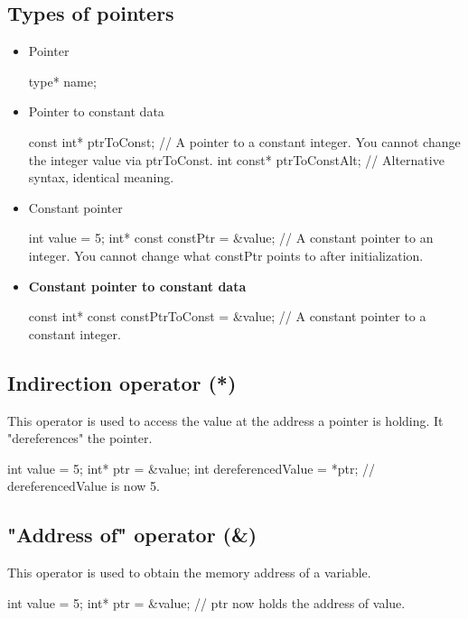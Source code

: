 \documentclass{report}
\begin{document}
    \subsection{Types of pointers}
    \begin{itemize}
        \item Pointer
            \bigbreak \noindent 
            \begin{cppcode}
            type* name;
            \end{cppcode}
        \item Pointer to constant data
            \bigbreak \noindent 
            \begin{cppcode}
            const int* ptrToConst; // A pointer to a constant integer. You cannot change the integer value via ptrToConst.
            int const* ptrToConstAlt; // Alternative syntax, identical meaning.
            \end{cppcode}
        \item Constant pointer
            \bigbreak \noindent 
            \begin{cppcode}
            int value = 5;
            int* const constPtr = &value; // A constant pointer to an integer. You cannot change what constPtr points to after initialization.
            \end{cppcode}
        \item \textbf{Constant pointer to constant data}
            \bigbreak \noindent 
            \begin{cppcode}
            const int* const constPtrToConst = &value; // A constant pointer to a constant integer.
            \end{cppcode}
    \end{itemize}

    \bigbreak \noindent 
    \subsection{Indirection operator (*)}
    \bigbreak \noindent 
    This operator is used to access the value at the address a pointer is holding. It "dereferences" the pointer.
    \bigbreak \noindent 
    \begin{cppcode}
        int value = 5;
        int* ptr = &value;
        int dereferencedValue = *ptr; // dereferencedValue is now 5.
    \end{cppcode}

    \bigbreak \noindent 
    \subsection{"Address of" operator (\&)}
    \bigbreak \noindent 
    This operator is used to obtain the memory address of a variable.
    \bigbreak \noindent 
    \begin{cppcode}
    int value = 5;
    int* ptr = &value; // ptr now holds the address of value.
    \end{cppcode}
\end{document}
